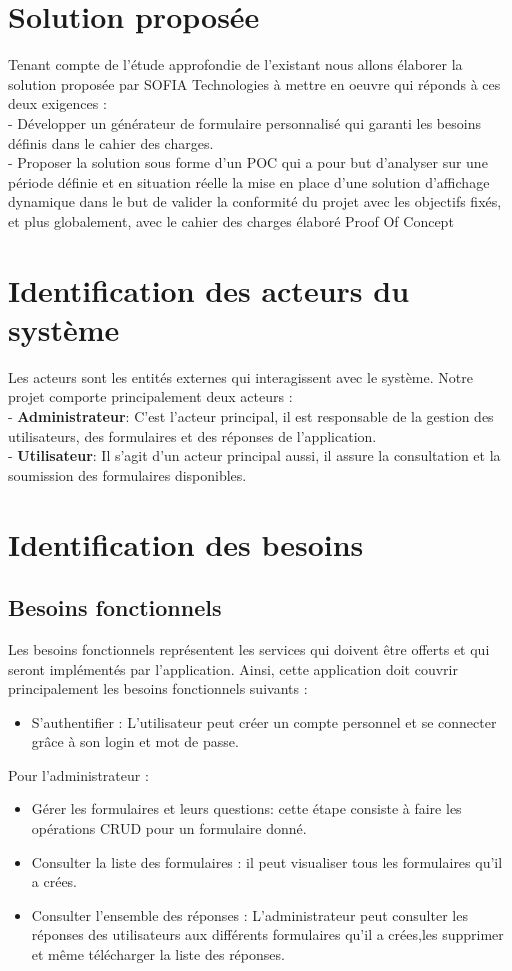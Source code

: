 \section{Solution proposée}
Tenant compte de l’étude approfondie de l’existant nous allons élaborer la solution proposée par SOFIA Technologies à mettre en oeuvre qui réponds à ces deux exigences : \\
- Développer un générateur de formulaire personnalisé qui garanti les besoins définis dans le cahier des charges.\\
- Proposer la solution sous forme d'un POC qui a pour but d’analyser sur une période définie et en situation réelle la mise en place d’une solution d’affichage dynamique dans le but de valider la conformité du projet avec les objectifs fixés, et plus globalement, avec le cahier des charges élaboré {Proof Of Concept \cite{webArticle2}}
\section{Identification des acteurs du système}
Les acteurs sont les entités externes qui interagissent avec le système. Notre projet comporte principalement deux acteurs :\\
- \textbf{Administrateur}: C’est l’acteur principal, il est responsable de la gestion des utilisateurs, des formulaires et des réponses de l’application.\\
- \textbf{Utilisateur}: Il s’agit d’un acteur principal aussi, il assure la consultation et la soumission des formulaires disponibles.
        
\section{Identification des besoins}
    \subsection{Besoins fonctionnels}
Les besoins fonctionnels représentent les services qui doivent être offerts et qui seront implémentés par l’application. Ainsi, cette application doit couvrir principalement les
besoins fonctionnels suivants :
\begin{itemize}
    \item S’authentifier : L’utilisateur peut créer un compte personnel et se connecter grâce à son login et mot de passe.
\end{itemize}
Pour l’administrateur :
\begin{itemize}
    \item Gérer les formulaires et leurs questions: cette étape consiste à faire les opérations CRUD pour un formulaire donné.
    \item Consulter la liste des formulaires : il peut visualiser tous les formulaires qu'il a crées.
    \item Consulter l’ensemble des réponses : L’administrateur peut consulter les réponses des utilisateurs aux différents formulaires qu'il a crées,les supprimer et même télécharger la liste des réponses.
\end{itemize}

